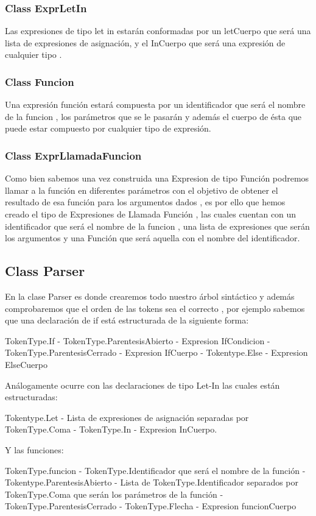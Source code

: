 \documentclass[a4paper,12pt]{article}
\begin{document}
\subsubsection[short]{Class ExprLetIn}
Las expresiones de tipo let in estarán conformadas por un letCuerpo que será una lista de expresiones de asignación, y el InCuerpo que será una expresión de cualquier tipo .
\subsubsection[short]{Class Funcion}
Una expresión función estará compuesta por un identificador que será el nombre de la funcion , los parámetros que se le pasarán y además el cuerpo de ésta que puede estar compuesto por  cualquier tipo de expresión.
\subsubsection[short]{Class ExprLlamadaFuncion}
Como bien sabemos una vez construida una Expresion de tipo Función podremos llamar a la función en diferentes parámetros con el objetivo de obtener el resultado de esa función  para los argumentos dados , es por ello que hemos creado el tipo de Expresiones 
de Llamada Función , las cuales cuentan con un identificador que será el nombre de la funcion , una lista de expresiones que serán los argumentos y una Función que será aquella con el nombre del identificador.

\subsection{Class Parser}
En la clase Parser es donde crearemos todo nuestro árbol sintáctico y además comprobaremos que el orden de las tokens sea el correcto , por ejemplo sabemos que 
una declaración de if está estructurada de la siguiente forma:


TokenType.If - TokenType.ParentesisAbierto - Expresion IfCondicion - TokenType.ParentesisCerrado - Expresion IfCuerpo - Tokentype.Else - Expresion ElseCuerpo

Análogamente ocurre con las declaraciones de tipo Let-In las cuales están estructuradas:

Tokentype.Let - Lista de expresiones de asignación separadas por TokenType.Coma - TokenType.In - Expresion InCuerpo.

Y las funciones:

TokenType.funcion - TokenType.Identificador que será el nombre de la función - Tokentype.ParentesisAbierto - Lista de TokenType.Identificador separados por TokenType.Coma que serán los parámetros de la función - TokenType.ParentesisCerrado - TokenType.Flecha - Expresion funcionCuerpo
\end{document}
